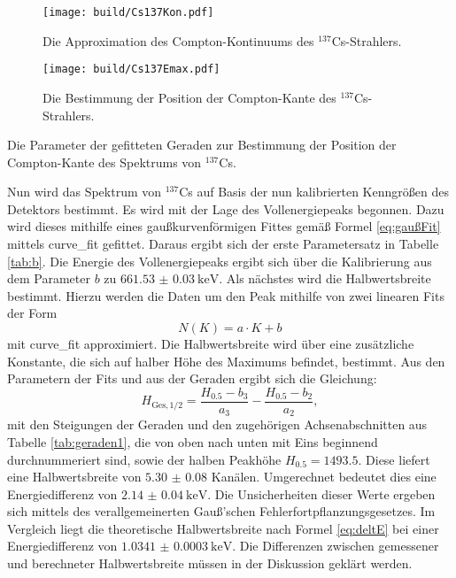 \begin{figure}
	\centering
	\texttt{[image: build/Cs137Kon.pdf]}
	\caption{Die Approximation des Compton-Kontinuums des $^{137}$Cs-Strahlers.}
	\label{fig:Comptonkontinuums}
\end{figure}
\begin{figure}
	\centering
	\texttt{[image: build/Cs137Emax.pdf]}
	\caption{Die Bestimmung der Position der Compton-Kante des $^{137}$Cs-Strahlers.}
	\label{fig:Emax}
\end{figure}
\begin{table}
	\centering
	\caption{Die Parameter der gefitteten Geraden zur Bestimmung der Position der Compton-Kante des Spektrums von $^{137}$Cs.}
	
\end{table}
Nun wird das Spektrum von $^{137}$Cs auf Basis der nun kalibrierten Kenngrößen des Detektors bestimmt. Es wird mit der Lage des Vollenergiepeaks begonnen. Dazu wird dieses mithilfe eines gaußkurvenförmigen Fittes gemäß Formel \eqref{eq:gaußFit} mittels curve\_fit \cite{scipy} gefittet. Daraus ergibt sich der erste Parametersatz in Tabelle \ref{tab:b}.
Die Energie des Vollenergiepeaks ergibt sich über die Kalibrierung aus dem Parameter $b$ zu $\SI{661.53(3)}{\kilo\electronvolt}$.
Als nächstes wird die Halbwertsbreite bestimmt. Hierzu werden die Daten um den Peak mithilfe von zwei linearen Fits der Form
\begin{equation}
	N(K)=a \cdot K + b \label{eq:geradeKN}
\end{equation}
mit curve\_fit \cite{scipy} approximiert. Die Halbwertsbreite wird über eine zusätzliche Konstante, die sich auf halber Höhe des Maximums befindet, bestimmt. Aus den Parametern der Fits und aus der Geraden ergibt sich die Gleichung:
\begin{equation}
    H_{\text{Ges},1/2} = \frac{H_{0.5}-b_3}{a_3} - \frac{H_{0.5}-b_2}{a_2}, \label{eq:Z}
\end{equation}
mit den Steigungen der Geraden und den zugehörigen Achsenabschnitten aus Tabelle \ref{tab:geraden1}, die von oben nach unten mit Eins beginnend durchnummeriert sind, sowie der halben Peakhöhe $H_{0.5}=\num{1493.5}$. Diese liefert eine Halbwertsbreite von $\num{5.30(8)}$ Kanälen. Umgerechnet bedeutet dies eine Energiedifferenz von $\SI{2.14(4)}{\kilo\electronvolt}$. Die Unsicherheiten dieser Werte ergeben sich mittels des verallgemeinerten Gauß’schen Fehlerfortpflanzungsgesetzes.
Im Vergleich liegt die theoretische Halbwertsbreite nach Formel \eqref{eq:deltE} bei einer Energiedifferenz von $\SI{1.0341(3)}{\kilo\electronvolt}$. Die Differenzen zwischen gemessener und berechneter Halbwertsbreite müssen in der Diskussion geklärt werden. 

